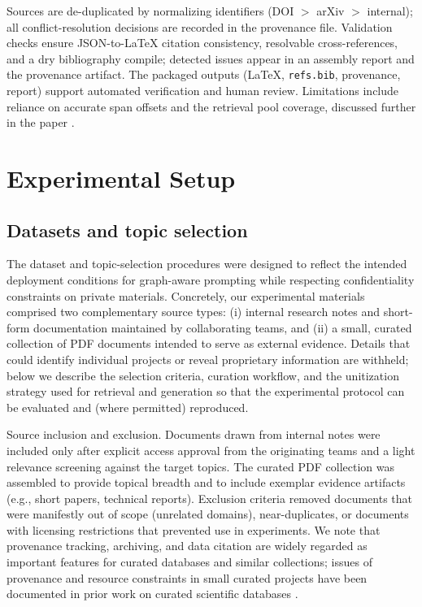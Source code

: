\documentclass{article}%
\begin{document}
Sources are de-duplicated by normalizing identifiers (DOI $>$ arXiv $>$ internal); all conflict-resolution decisions are recorded in the provenance file. Validation checks ensure JSON-to-LaTeX citation consistency, resolvable cross-references, and a dry bibliography compile; detected issues appear in an assembly report and the provenance artifact. The packaged outputs (LaTeX, \texttt{refs.bib}, provenance, report) support automated verification and human review. Limitations include reliance on accurate span offsets and the retrieval pool coverage, discussed further in the paper \cite{web_bos_2023_latex_metadata_and_publishing_workflows}.%

%
\section{Experimental Setup}%
\subsection{Datasets and topic selection}%


%
The dataset and topic-selection procedures were designed to reflect the intended deployment conditions for graph-aware prompting while respecting confidentiality constraints on private materials. Concretely, our experimental materials comprised two complementary source types: (i) internal research notes and short-form documentation maintained by collaborating teams, and (ii) a small, curated collection of PDF documents intended to serve as external evidence. Details that could identify individual projects or reveal proprietary information are withheld; below we describe the selection criteria, curation workflow, and the unitization strategy used for retrieval and generation so that the experimental protocol can be evaluated and (where permitted) reproduced.

Source inclusion and exclusion. Documents drawn from internal notes were included only after explicit access approval from the originating teams and a light relevance screening against the target topics. The curated PDF collection was assembled to provide topical breadth and to include exemplar evidence artifacts (e.g., short papers, technical reports). Exclusion criteria removed documents that were manifestly out of scope (unrelated domains), near-duplicates, or documents with licensing restrictions that prevented use in experiments. We note that provenance tracking, archiving, and data citation are widely regarded as important features for curated databases and similar collections; issues of provenance and resource constraints in small curated projects have been documented in prior work on curated scientific databases \cite{web_fowler_2020_cross_tier_web_programming_for_curated_databases}.
\end{document}
